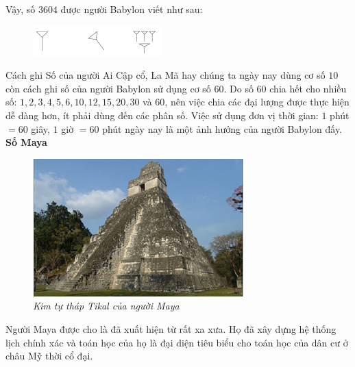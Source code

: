 \begin{multicols}{2}
\begin{figure}[H]
	\end{figure}
	Vậy, số $3604$ được người Babylon viết như sau:
	\begin{figure}[H]
		\centering
		\captionsetup{labelformat= empty, justification=centering}
		\includegraphics[width=0.75\linewidth]{27}
		\vspace*{-10pt}
	\end{figure}
	Cách ghi Số của người Ai Cập cổ, La Mã hay chúng ta ngày nay dùng cơ số $10$ còn cách ghi số của người Babylon sử dụng cơ số $60$. Do số $60$ chia hết cho nhiều số: $1,2,3,4,5,6, 10, 12, 15, 20,30$ và $60$, nên việc chia các đại lượng được thực hiện dễ dàng hơn, ít phải dùng đến các phân số. Việc sử dụng đơn vị thời gian: $1$ phút $= 60$ giây, $1$ giờ $= 60$ phút ngày nay là một ảnh hưởng của người Babylon đấy.
	\vskip 0.1cm
	\textbf{\color{toancuabi}Số Maya}
	\vskip 0.1cm
	\begin{figure}[H]
		\centering
		\vspace*{-10pt}
		\captionsetup{labelformat= empty, justification=centering}
		\includegraphics[width=1\linewidth]{28}
		\caption{\textit{\color{toancuabi}Kim tự tháp Tikal của người Maya}}
		\vspace*{-15pt}
	\end{figure}
	Người Maya  được cho là đã xuất hiện từ rất xa xưa. Họ đã xây dựng hệ thống lịch chính xác và toán học của họ là đại diện tiêu biểu cho toán học của dân cư ở châu Mỹ thời cổ đại.

\end{multicols}
